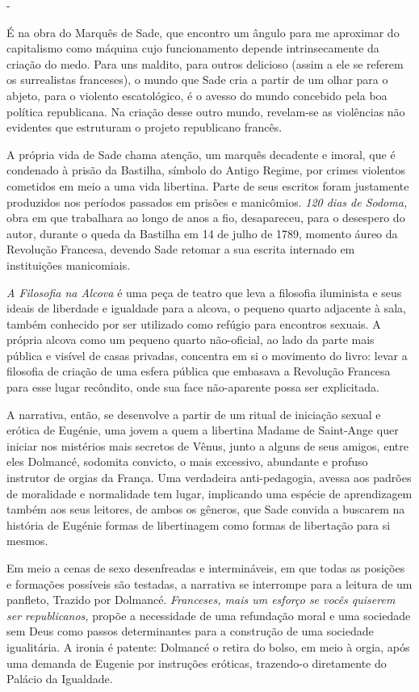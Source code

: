 -

É na obra do Marquês de Sade, que encontro um ângulo para me aproximar
do capitalismo como máquina cujo funcionamento depende intrinsecamente
da criação do medo. Para uns maldito, para outros delicioso (assim a ele
se referem os surrealistas franceses), o mundo que Sade cria a partir de
um olhar para o abjeto, para o violento escatológico, é o avesso do
mundo concebido pela boa política republicana. Na criação desse outro
mundo, revelam-se as violências não evidentes que estruturam o projeto
republicano francês.

A própria vida de Sade chama atenção, um marquês decadente e imoral, que
é condenado à prisão da Bastilha, símbolo do Antigo Regime, por crimes
violentos cometidos em meio a uma vida libertina. Parte de seus escritos
foram justamente produzidos nos períodos passados em prisões e
manicômios. \emph{120 dias de Sodoma,} obra em que trabalhara ao longo
de anos a fio, desapareceu, para o desespero do autor, durante o queda
da Bastilha em 14 de julho de 1789, momento áureo da Revolução Francesa,
devendo Sade retomar a sua escrita internado em instituições
manicomiais.

\emph{A Filosofia na Alcova} é uma peça de teatro que leva a filosofia
iluminista e seus ideais de liberdade e igualdade para a alcova, o
pequeno quarto adjacente à sala, também conhecido por ser utilizado como
refúgio para encontros sexuais. A própria alcova como um pequeno quarto
não-oficial, ao lado da parte mais pública e visível de casas privadas,
concentra em si o movimento do livro: levar a filosofia de criação de
uma esfera pública que embasava a Revolução Francesa para esse lugar
recôndito, onde sua face não-aparente possa ser explicitada.

A narrativa, então, se desenvolve a partir de um ritual de iniciação
sexual e erótica de Eugénie, uma jovem a quem a libertina Madame de
Saint-Ange quer iniciar nos mistérios mais secretos de Vênus, junto a
alguns de seus amigos, entre eles Dolmancé, sodomita convicto, o mais
excessivo, abundante e profuso instrutor de orgias da França. Uma
verdadeira anti-pedagogia, avessa aos padrões de moralidade e
normalidade tem lugar, implicando uma espécie de aprendizagem também aos
seus leitores, de ambos os gêneros, que Sade convida a buscarem na
história de Eugénie formas de libertinagem como formas de libertação
para si mesmos.

Em meio a cenas de sexo desenfreadas e intermináveis, em que todas as
posições e formações possíveis são testadas, a narrativa se interrompe
para a leitura de um panfleto, Trazido por Dolmancé. \emph{Franceses,
mais um esforço se vocês quiserem ser republicanos,} propõe a
necessidade de uma refundação moral e uma sociedade sem Deus como passos
determinantes para a construção de uma sociedade igualitária. A ironia é
patente: Dolmancé o retira do bolso, em meio à orgia, após uma demanda
de Eugenie por instruções eróticas, trazendo-o diretamente do Palácio da
Igualdade.

